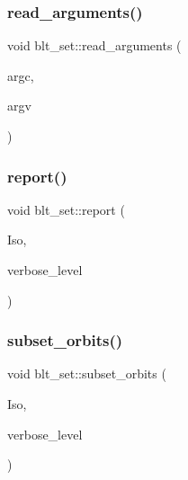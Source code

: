 \mbox{\label{classblt__set_a2c9376bf8921d08c686526482aefd1f0}} 
\subsubsection{\texorpdfstring{read\+\_\+arguments()}{read\_arguments()}}
{\footnotesize\ttfamily void blt\+\_\+set\+::read\+\_\+arguments (\begin{DoxyParamCaption}\item[{int}]{argc,  }\item[{const char $\ast$$\ast$}]{argv }\end{DoxyParamCaption})}

\mbox{\label{classblt__set_a6b19f88bd2b92ebfba7e7c362eb9065c}} 
\subsubsection{\texorpdfstring{report()}{report()}}
{\footnotesize\ttfamily void blt\+\_\+set\+::report (\begin{DoxyParamCaption}\item[{\mbox{\hyperlink{classisomorph}{isomorph}} \&}]{Iso,  }\item[{\mbox{\hyperlink{galois_8h_a09fddde158a3a20bd2dcadb609de11dc}{I\+NT}}}]{verbose\+\_\+level }\end{DoxyParamCaption})}

\mbox{\label{classblt__set_af8f79fc4346244acfa0e2c2d23c36993}} 
\subsubsection{\texorpdfstring{subset\+\_\+orbits()}{subset\_orbits()}}
{\footnotesize\ttfamily void blt\+\_\+set\+::subset\+\_\+orbits (\begin{DoxyParamCaption}\item[{\mbox{\hyperlink{classisomorph}{isomorph}} \&}]{Iso,  }\item[{\mbox{\hyperlink{galois_8h_a09fddde158a3a20bd2dcadb609de11dc}{I\+NT}}}]{verbose\+\_\+level }\end{DoxyParamCaption})}




